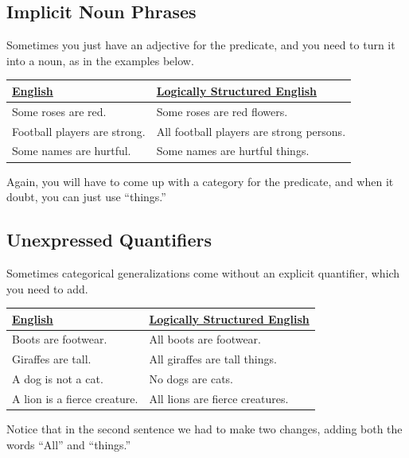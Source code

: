 \subsection{Implicit Noun Phrases}

Sometimes you just have an adjective for the predicate, and you need to turn it into a noun, as in the examples below. 


\begin{longtabu}{p{.5\linewidth}p{.5\linewidth}}
\underline{English} &
\underline{Logically Structured English}  \\
\endhead 
Some roses are red. &
Some roses are red flowers. \\

Football players are strong. &
All football players are strong persons. \\

Some names are hurtful. &
Some names are hurtful things.
\end{longtabu}

Again, you will have to come up with a category for the predicate, and when it doubt, you can just use ``things.''



\subsection{Unexpressed Quantifiers}

Sometimes categorical generalizations come without an explicit quantifier, which you need to add. 


\begin{longtabu}{p{.5\linewidth}p{.5\linewidth}}
\underline{English} &
\underline{Logically Structured English} \\
\endhead 
Boots are footwear. &
All boots are footwear.\\

Giraffes are tall. &
All giraffes are tall things.\\

A dog is not a cat. & 
No dogs are cats.\\

A lion is a fierce creature. &
All lions are fierce creatures.\\

\end{longtabu}

Notice that in the second sentence we had to make two changes, adding both the words ``All'' and ``things.''

